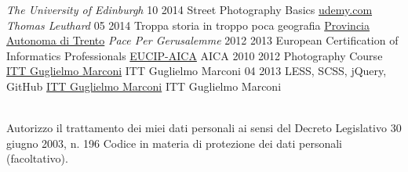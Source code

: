 \documentclass[]{friggeri-cv}
\begin{document}
\begin{entrylist}
    {\emph{The University of Edinburgh}}
\entry
    {10 2014}
    {Street Photography Basics}
    {\href{https://www.udemy.com}{udemy.com}}
    {\emph{Thomas Leuthard}}
 \entry
    {05 2014}
    {Troppa storia in troppo poca geografia}
    {\href{http://www.provincia.tn.it}{Provincia Autonoma di Trento}}
    {\emph{Pace Per Gerusalemme}}
\entry
    {2012 2013}
    {European Certification of Informatics Professionals}
    {\href{http://www.eucip.it}{EUCIP-AICA}}
    {AICA}
\entry
    {2010 2012}
    {Photography Course}
    {\href{http://marconirovereto.it}{ITT Guglielmo Marconi}}
    {ITT Guglielmo Marconi}
\entry
    {04 2013}
    {LESS, SCSS, jQuery, GitHub}
    {\href{http://marconirovereto.it}{ITT Guglielmo Marconi}}
    {ITT Guglielmo Marconi}
\end{entrylist}
\\
Autorizzo il trattamento dei miei dati personali ai sensi del Decreto Legislativo 30 giugno 2003, n. 196 Codice in materia di protezione dei dati personali (facoltativo).
\end{document}
